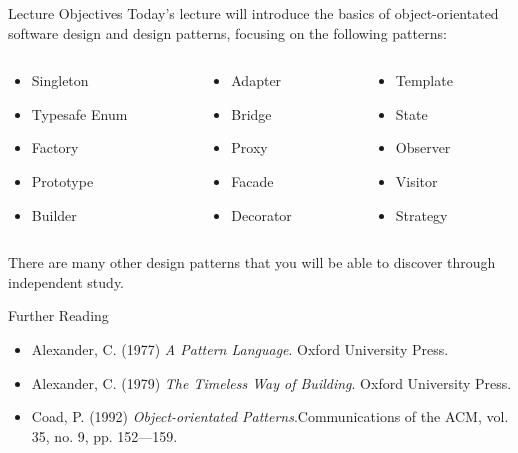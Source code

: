\begin{frame}{Lecture Objectives}
	Today's lecture will introduce the basics of object-orientated software design and design patterns, focusing on
	the following patterns:
	
	\vspace{2ex}
	
	\begin{columns}[onlytextwidth]
		\begin{column}{0.33\textwidth}
			\begin{itemize}
				\item Singleton
				\item Typesafe Enum
				\item Factory
				\item Prototype
				\item Builder
			\end{itemize}
		\end{column}
		\begin{column}{0.33\textwidth}
			\begin{itemize}
				\item Adapter
				\item Bridge
				\item Proxy
				\item Facade
				\item Decorator
			\end{itemize}
		\end{column}
		\begin{column}{0.33\textwidth}
			\begin{itemize}
				\item Template
				\item State
				\item Observer
				\item Visitor				
				\item Strategy
			\end{itemize}
		\end{column}
	\end{columns}
	
	\vspace{3ex}
	 
	There are many other design patterns that you will be able to discover through independent study.
	
\end{frame}

\begin{frame}{Further Reading}
	\begin{itemize}
		\item Alexander, C. (1977) \textit{A Pattern Language}. Oxford University Press.	
		\vspace{1ex}
		\item Alexander, C. (1979) \textit{The Timeless Way of Building}. Oxford University Press.
		\vspace{1ex}
		\item Coad, P. (1992) \textit{Object-orientated Patterns}.Communications of the ACM, vol. 35, no. 9, pp. 152---159.
	\end{itemize}
\end{frame}

